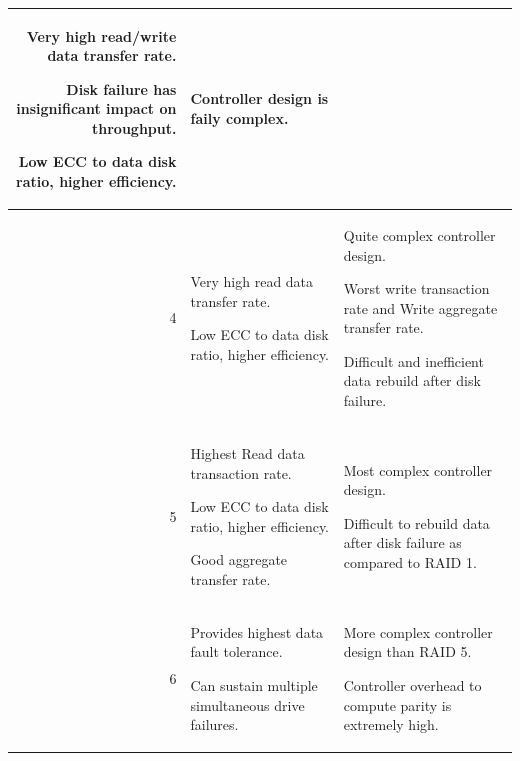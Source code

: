 \begin{table}[H]
\begin{tabularx}{\textwidth}{|r|*{2}{>{\RaggedRight\arraybackslash}X|}}
        Very high read/write data transfer rate. \par
        Disk failure has insignificant impact on throughput. \par
        Low ECC to data disk ratio, higher efficiency.

        &

        Controller design is faily complex.
        
        \\ \hline

        4 &

        Very high read data transfer rate. \par
        Low ECC to data disk ratio, higher efficiency.

        &

        Quite complex controller design. \par
        Worst write transaction rate and Write aggregate transfer rate. \par
        Difficult and inefficient data rebuild after disk failure.

        \\ \hline

        5 &

        Highest Read data transaction rate. \par
        Low ECC to data disk ratio, higher efficiency. \par
        Good aggregate transfer rate.

        &

        Most complex controller design. \par
        Difficult to rebuild data after disk failure as compared to RAID 1.

        \\ \hline

        6 &

        Provides highest data fault tolerance. \par
        Can sustain multiple simultaneous drive failures.

        &

        More complex controller design than RAID 5. \par
        Controller overhead to compute parity is extremely high.

        \\ \hline
        
    \end{tabularx}
\end{table}